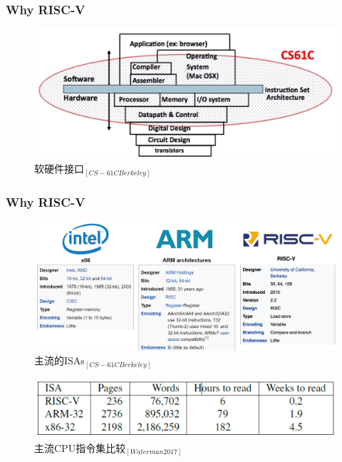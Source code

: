 \documentclass[UTF8]{ctexbeamer}
\begin{document}
\begin{frame}[plain]
	
	\frametitle{Why RISC-V}
	\begin{figure}
		\centering
		\includegraphics[width=1.4\linewidth]{hardware-software-interface}
		\caption{软硬件接口$ _{[CS-61C Berkeley]} $}
	\end{figure}
	
	
\end{frame}


\begin{frame}
	
	\frametitle{Why RISC-V}
	
	\begin{figure}
		\centering
		\includegraphics[width=0.75\linewidth]{mainstream-isas}
		\caption{主流的ISAs$ _{[CS-61C Berkeley]} $}
	\end{figure}
	
	\begin{figure}
		\centering
		\includegraphics[width=0.65\linewidth]{x86-arm-rv-compare}
		\caption{主流CPU指令集比较$ _{[Waterman 2017]} $}
	\end{figure}
	
	
	
	
\end{frame}
\end{document}
